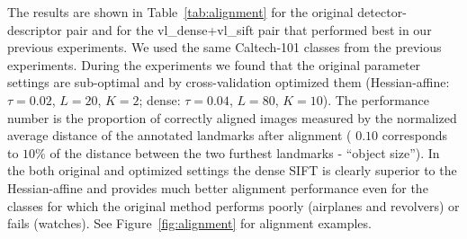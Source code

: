\documentclass[10pt,journal,cspaper,compsoc]{IEEEtran}
\begin{document}
The results are shown in Table~\ref{tab:alignment}
for the original detector-descriptor pair and for the
vl\_dense+vl\_sift pair that performed best in our previous experiments.
We used the same Caltech-101 classes from the
previous experiments. During the experiments we found that
the original parameter settings are sub-optimal
and by cross-validation optimized them
(Hessian-affine: $\tau=0.02$, $L=20$, $K=2$;
dense: $\tau=0.04$, $L=80$, $K=10$).
The performance number is the proportion of correctly
aligned images measured by the normalized average distance
of the annotated landmarks after alignment (
$0.10$ corresponds to $10\%$ of the distance between the two
furthest landmarks - ``object size''). In the both original and optimized settings
the dense SIFT is clearly superior to the Hessian-affine and
provides much better alignment performance even for the classes
for which the original method performs poorly (airplanes and
revolvers) or fails (watches). See Figure~\ref{fig:alignment} for
alignment examples.
%
\end{document}
